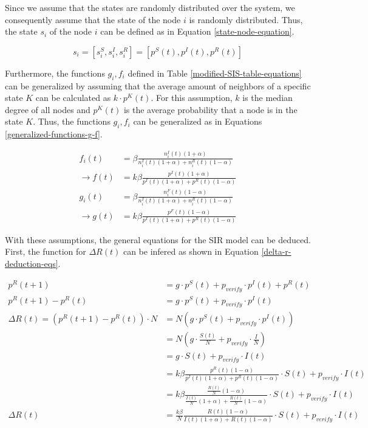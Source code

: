 Since we assume that the states are randomly distributed over the system, 
we consequently assume that the state of the node $i$ is randomly distributed.
Thus, the state $s_i$ of the node $i$ can be defined as in Equation 
\ref{state-node-equation}.

\begin{equation}
    s_i = [s_i^S, s_i^I, s_i^R] = [p^S(t), p^I(t), p^R(t)]
    \label{state-node-equation}
\end{equation}

Furthermore, the functions $g_i,f_i$ defined in Table 
\ref{modified-SIS-table-equations}
can be generalized by assuming that the average amount of neighbors 
of a specific state $K$ can be calculated as $k\cdot p^K(t)$. For this
assumption, $k$ is the median degree of all nodes and $p^K(t)$ is the 
average probability that a node is in the state $K$.
Thus, the functions $g_i,f_i$ can be generalized as in
Equations \ref{generalized-functions-g-f}.

\begin{subequations}
\begin{align}
    f_i(t) &= \beta \frac{n_i^I(t)(1+\alpha)}{n_i^I(t)(1+\alpha)+n_i^R(t)(1-\alpha)} 
    \nonumber\\
    \to f(t) &= k\beta \frac{p^I(t)(1+\alpha)}{p^I(t)(1+\alpha)+p^R(t)(1-\alpha)}
    \label{generalized-function-f} \\
    g_i(t) &= \beta \frac{n_i^F(t)(1-\alpha)}{n_i^I(t)(1+\alpha)+n_i^R(t)(1-\alpha)} 
    \nonumber \\
    \to g(t) &= k\beta \frac{p^F(t)(1-\alpha)}{p^I(t)(1+\alpha)+p^R(t)(1-\alpha)}
    \label{generalized-function-g}
\end{align}
\label{generalized-functions-g-f}
\end{subequations}

With these assumptions, the general equations for the SIR model can 
be deduced. First, the function for $\Delta R(t)$ can be infered
as shown in Equation \ref{delta-r-deduction-eqs}.

\begin{align}
    p^R(t+1) &= g \cdot p^S(t) + p_{verify}\cdot p^I(t) + p^R(t) \nonumber\\
    p^R(t+1) - p^R(t) &= g \cdot p^S(t) + p_{verify}\cdot p^I(t) \nonumber\\
    \Delta R(t) = (p^R(t+1) - p^R(t))\cdot N 
    &= N(g \cdot p^S(t) + p_{verify}\cdot p^I(t)) \nonumber\\
    &= N(g \cdot \frac{S(t)}{N} + p_{verify}\cdot \frac{I}{N} ) \nonumber\\
    &= g \cdot S(t) + p_{verify}\cdot I(t) \nonumber\\
    &= k\beta \frac{p^R(t)(1-\alpha)}{p^I(t)(1+\alpha)+p^R(t)(1-\alpha)} 
    \cdot S(t) + p_{verify}\cdot I(t) \nonumber\\
    &= k\beta \frac{\frac{R(t)}{N}(1-\alpha)}{\frac{I(t)}{N}(1+\alpha)+\frac{R(t)}{N}(1-\alpha)} 
    \cdot S(t) + p_{verify}\cdot I(t) \nonumber\\
    \Delta R(t) &= \frac{k\beta}{N} \frac{R(t)(1-\alpha)}{I(t)(1+\alpha)+R(t)(1-\alpha)} 
    \cdot S(t) + p_{verify}\cdot I(t) \label{delta-r-deduction-eqs}
\end{align}

